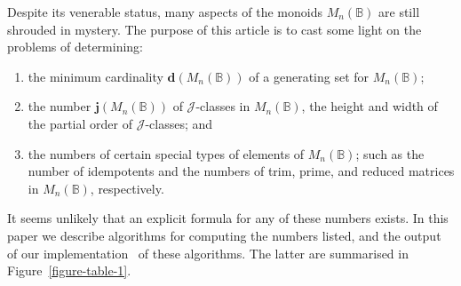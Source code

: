 \documentclass[11pt]{article}
\numberwithin{equation}{section}
\newcommand{\B}{\mathbb{B}}
\newcommand{\Bn}{M_n(\B)}
\newcommand{\J}{\mathscr{J}}
\begin{document}
Despite its venerable status, many aspects of the monoids $\Bn$ are still
shrouded in mystery. The purpose of this article is to cast some light on the
problems of determining:

\begin{enumerate}[(1)]
  \item \label{enum-min-gen-set}
    the minimum cardinality $\mathbf{d}(\Bn)$ of a generating set for $\Bn$;
  \item \label{enum-J-order}
    the number $\mathbf{j}(\Bn)$ of $\J$-classes in $\Bn$, the height and width of the partial
    order of $\J$-classes; and
  \item \label{enum-special} 
    the numbers of certain special types of elements of $\Bn$; such
    as the number of idempotents and the numbers of trim, prime, and reduced
    matrices in $\Bn$, respectively.
\end{enumerate}
It seems unlikely that an explicit formula for any of these numbers exists.
In this paper we describe algorithms for computing the numbers listed,
and the output of our implementation~\cite{} of these algorithms. The latter
are summarised in Figure~\ref{figure-table-1}.
\end{document}
